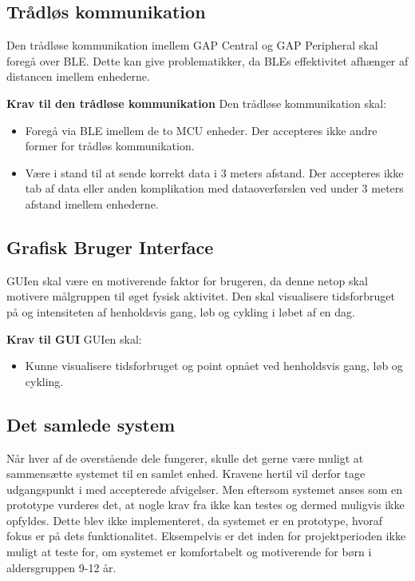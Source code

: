 \subsection{Trådløs kommunikation}\label{krav_BLE}
Den trådløse kommunikation imellem GAP Central og GAP Peripheral skal foregå over BLE. Dette kan give problematikker, da BLEs effektivitet afhænger af distancen imellem enhederne. 

\textbf{Krav til den trådløse kommunikation} \newline 
Den trådløse kommunikation skal:
\begin{itemize}
	\item Foregå via BLE imellem de to MCU enheder. Der accepteres ikke andre former for trådløs kommunikation.
	\item Være i stand til at sende korrekt data i 3 meters afstand. Der accepteres ikke tab af data eller anden komplikation med dataoverførslen ved under 3 meters afstand imellem enhederne.
\end{itemize}

\subsection{Grafisk Bruger Interface}\label{krav_GUI}
GUIen skal være en motiverende faktor for brugeren, da denne netop skal motivere målgruppen til øget fysisk aktivitet. Den skal visualisere tidsforbruget på og intensiteten af henholdsvis gang, løb og cykling i løbet af en dag. %

\textbf{Krav til GUI} \newline 
GUIen skal:
\begin{itemize}
	\item Kunne visualisere tidsforbruget og point opnået ved henholdsvis gang, løb og cykling. 
\end{itemize}

\subsection{Det samlede system} \label{krav_samlet_sys}
Når hver af de overstående dele fungerer, skulle det gerne være muligt at sammensætte systemet til en samlet enhed. Kravene hertil vil derfor tage udgangspunkt i  med accepterede afvigelser. Men eftersom systemet anses som en prototype vurderes det, at nogle krav fra  ikke kan testes og dermed muligvis ikke opfyldes. Dette blev ikke implementeret, da systemet er en prototype, hvoraf fokus er på dets funktionalitet. Eksempelvis er det inden for projektperioden ikke muligt at teste for, om systemet er komfortabelt og motiverende for børn i aldersgruppen 9-12 år.

